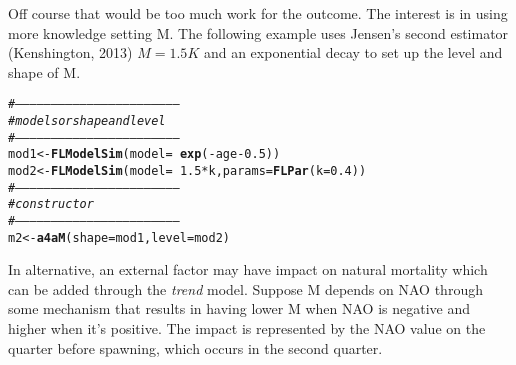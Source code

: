 \documentclass[a4paper,english,10pt]{article}\usepackage[]{graphicx}\usepackage[]{color}
\makeatletter
\newcommand{\hlnum}[1]{\textcolor[rgb]{0.686,0.059,0.569}{#1}}%
\newcommand{\hlcom}[1]{\textcolor[rgb]{0.678,0.584,0.686}{\textit{#1}}}%
\newcommand{\hlopt}[1]{\textcolor[rgb]{0,0,0}{#1}}%
\newcommand{\hlstd}[1]{\textcolor[rgb]{0.345,0.345,0.345}{#1}}%
\newcommand{\hlkwb}[1]{\textcolor[rgb]{0.69,0.353,0.396}{#1}}%
\newcommand{\hlkwc}[1]{\textcolor[rgb]{0.333,0.667,0.333}{#1}}%
\newcommand{\hlkwd}[1]{\textcolor[rgb]{0.737,0.353,0.396}{\textbf{#1}}}%
\newenvironment{kframe}{%
 \def\at@end@of@kframe{}%
 \ifinner\ifhmode%
  \def\at@end@of@kframe{\end{minipage}}%
  \begin{minipage}{\columnwidth}%
 \fi\fi%
 \def\FrameCommand##1{\hskip\@totalleftmargin \hskip-\fboxsep
 \colorbox{shadecolor}{##1}\hskip-\fboxsep
     \hskip-\linewidth \hskip-\@totalleftmargin \hskip\columnwidth}%
 \MakeFramed {\advance\hsize-\width
   \@totalleftmargin\z@ \linewidth\hsize
   \@setminipage}}%
 {\par\unskip\endMakeFramed%
 \at@end@of@kframe}
\newenvironment{knitrout}{}{} %
\makeatother
\begin{document}
Off course that would be too much work for the outcome. The interest is in using more knowledge setting M. The following example uses Jensen's second estimator (Kenshington, 2013) $M=1.5K$ and an exponential decay to set up the level and shape of M.

\begin{knitrout}
\color{fgcolor}\begin{kframe}
\begin{alltt}
\hlcom{# --------------------------------------------------------------------}
\hlcom{# models or shape and level}
\hlcom{# --------------------------------------------------------------------}
\hlstd{mod1} \hlkwb{<-} \hlkwd{FLModelSim}\hlstd{(}\hlkwc{model} \hlstd{=} \hlopt{~}\hlkwd{exp}\hlstd{(}\hlopt{-}\hlstd{age} \hlopt{-} \hlnum{0.5}\hlstd{))}
\hlstd{mod2} \hlkwb{<-} \hlkwd{FLModelSim}\hlstd{(}\hlkwc{model} \hlstd{=} \hlopt{~}\hlnum{1.5} \hlopt{*} \hlstd{k,} \hlkwc{params} \hlstd{=} \hlkwd{FLPar}\hlstd{(}\hlkwc{k} \hlstd{=} \hlnum{0.4}\hlstd{))}
\hlcom{# --------------------------------------------------------------------}
\hlcom{# constructor}
\hlcom{# --------------------------------------------------------------------}
\hlstd{m2} \hlkwb{<-} \hlkwd{a4aM}\hlstd{(}\hlkwc{shape} \hlstd{= mod1,} \hlkwc{level} \hlstd{= mod2)}
\end{alltt}
\end{kframe}
\end{knitrout}


In alternative, an external factor may have impact on natural mortality which can be added through the \emph{trend} model. Suppose M depends on NAO through some mechanism that results in having lower M when NAO is negative and higher when it's positive. The impact is represented by the NAO value on the quarter before spawning, which occurs in the second quarter. 
\end{document}
